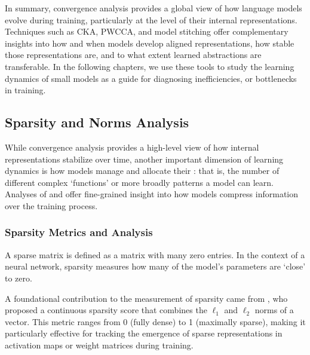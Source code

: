 In summary, convergence analysis provides a global view of how language models evolve during training, particularly at the level of their internal representations. Techniques such as CKA, PWCCA, and model stitching offer complementary insights into how and when models develop aligned representations, how stable those representations are, and to what extent learned abstractions are transferable. In the following chapters, we use these tools to study the learning dynamics of small models as a guide for diagnosing inefficiencies, or bottlenecks in training.

\subsection{Sparsity and Norms Analysis}

While convergence analysis provides a high-level view of how internal representations stabilize over time, another important dimension of learning dynamics is how models manage and allocate their : that is, the number of different complex `functions' or more broadly patterns a model can learn. Analyses of  and  offer fine-grained insight into how models compress information over the training process.


\subsubsection{Sparsity Metrics and Analysis}

A sparse matrix is defined as a matrix with many zero entries. In the context of a neural network, sparsity measures how many of the model's parameters are `close' to zero.

A foundational contribution to the measurement of sparsity came from \citet{hoyer2004sparsity}, who proposed a continuous sparsity score that combines the \( \ell_1 \) and \( \ell_2 \) norms of a vector. This  metric ranges from 0 (fully dense) to 1 (maximally sparse), making it particularly effective for tracking the emergence of sparse representations in activation maps or weight matrices during training.

